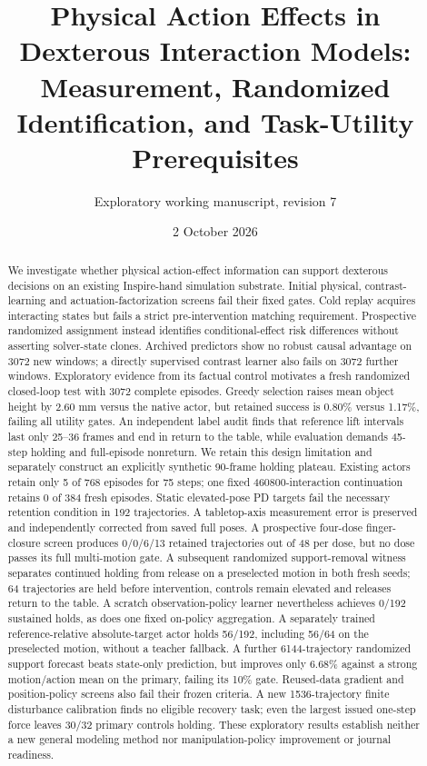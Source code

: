 \documentclass[10 pt]{article}
\title{Physical Action Effects in Dexterous Interaction Models:\\Measurement, Randomized Identification, and Task-Utility Prerequisites}
\author{Exploratory working manuscript, revision 7}
\date{2 October 2026}
\begin{document}
\maketitle
\begin{abstract}
We investigate whether physical action-effect information can support dexterous
decisions on an existing Inspire-hand simulation substrate. Initial physical,
contrast-learning and actuation-factorization screens fail their fixed gates.
Cold replay acquires interacting states but fails a strict pre-intervention
matching requirement. Prospective randomized assignment instead identifies
conditional-effect risk differences without asserting solver-state clones.
Archived predictors show no robust causal advantage on 3072 new windows; a
directly supervised contrast learner also fails on 3072 further windows.
Exploratory evidence from its factual control motivates a fresh randomized
closed-loop test with 3072 complete episodes. Greedy selection raises mean
object height by 2.60 mm versus the native actor, but retained success is
0.80\% versus 1.17\%, failing all utility gates. An independent label audit
finds that reference lift intervals last only 25--36 frames and end in return
to the table, while evaluation demands 45-step holding and full-episode nonreturn.
We retain this design limitation and separately construct an explicitly synthetic
90-frame holding plateau. Existing actors retain only 5 of 768 episodes for
75 steps; one fixed 460800-interaction continuation retains 0 of 384 fresh episodes.
Static elevated-pose PD targets fail the necessary retention condition in 192
trajectories. A tabletop-axis measurement error is preserved and independently
corrected from saved full poses. A prospective four-dose finger-closure screen
produces 0/0/6/13 retained trajectories out of 48 per dose, but no dose passes
its full multi-motion gate. A subsequent randomized support-removal witness separates
continued holding from release on a preselected motion in both fresh seeds;
64 trajectories are held before intervention, controls remain elevated and releases
return to the table. A scratch observation-policy learner nevertheless achieves
0/192 sustained holds, as does one fixed on-policy aggregation. A separately
trained reference-relative absolute-target actor holds 56/192, including 56/64
on the preselected motion, without a teacher fallback. A further 6144-trajectory randomized support forecast beats state-only prediction,
but improves only 6.68\% against a strong motion/action mean on the primary, failing
its 10\% gate. Reused-data gradient and position-policy screens also fail their
frozen criteria. A new 1536-trajectory finite disturbance calibration finds no
eligible recovery task; even the largest issued one-step force leaves 30/32 primary
controls holding. These exploratory results establish neither a new general
modeling method nor manipulation-policy improvement or journal readiness.
\end{abstract}
\end{document}

